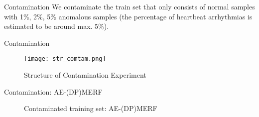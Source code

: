 \begin{frame}{Contamination}
    We contaminate the train set that only consists of normal samples with 1\%, 2\%, 5\% anomalous samples (the percentage of heartbeat arrhythmias is estimated to be around max. 5\%).
\end{frame}

\begin{frame}{Contamination}

    \begin{figure}[h]
        \centering
        \texttt{[image: str\_comtam.png]}
        \caption{Structure of Contamination Experiment}
        \label{fig:enter-label}
    \end{figure}

\end{frame}

\begin{frame}{Contamination: AE-(DP)MERF}
    \begin{figure}

        \centering

        \caption{Contaminated training set: AE-(DP)MERF}

    \end{figure}
\end{frame}

